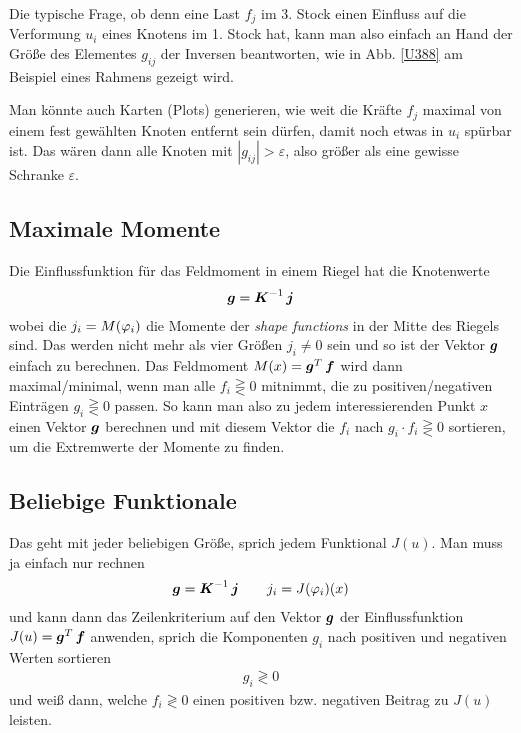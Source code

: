 {Die typische Frage, ob denn eine Last  $f_j$ im 3. Stock einen Einfluss auf die Verformung $u_i$ eines Knotens im 1. Stock hat, kann man also einfach an Hand der Gr\"{o}{\ss}e des Elementes $g_{ij}$ der Inversen beantworten, wie in Abb. \ref{U388} am Beispiel eines Rahmens gezeigt wird.

Man k\"{o}nnte auch Karten (Plots) generieren, wie weit die Kr\"{a}fte $f_j$ maximal von einem fest gew\"{a}hlten Knoten  entfernt sein d\"{u}rfen, damit noch etwas in $u_i$ sp\"{u}rbar ist. Das w\"{a}ren dann alle Knoten mit $|g_{ij}| > \varepsilon$, also gr\"{o}{\ss}er als eine gewisse Schranke $\varepsilon$.


{\textcolor{sectionTitleBlue}{\subsection{Maximale Momente}}}
Die Einflussfunktion f\"{u}r das Feldmoment in einem Riegel hat die Knotenwerte
 \begin{align}
 \mbox{\boldmath $g$} = \mbox{\boldmath $K$}^{-1}\,\mbox{\boldmath $j$}
 \end{align}
wobei die $j_i = M(\varphi_i)$ die Momente der {\em shape functions\/} in der Mitte des Riegels sind. Das werden nicht mehr als vier Gr\"{o}{\ss}en $j_i \neq 0$ sein und so ist der Vektor $\mbox{\boldmath $g$}$ einfach zu berechnen. Das Feldmoment $M(x) = \mbox{\boldmath $g$}^T\,\mbox{\boldmath $f$}$ wird dann maximal/minimal, wenn man alle $f_i \gtreqless 0$ mitnimmt, die zu positiven/negativen Eintr\"{a}gen $g_i \gtreqless 0$ passen. So kann man also zu jedem interessierenden Punkt $x$ einen Vektor $\mbox{\boldmath $g$}$ berechnen und mit diesem Vektor die $f_i$ nach $g_i \cdot f_i \gtreqless 0$ sortieren, um die Extremwerte der Momente zu finden.

{\textcolor{sectionTitleBlue}{\subsection{Beliebige Funktionale}}}
Das geht mit jeder beliebigen Gr\"{o}{\ss}e, sprich jedem Funktional $J(u)$. Man muss ja einfach nur rechnen
\begin{align}
\mbox{\boldmath $g$} = \mbox{\boldmath $K$}^{-1}\,\mbox{\boldmath $j$} \qquad j_i = J(\varphi_i)(x)
\end{align}
und kann dann das \glq Zeilenkriterium\grq{} auf den Vektor $\mbox{\boldmath $g$}$ der Einflussfunktion $J(u) = \mbox{\boldmath $g$}^T\,\mbox{\boldmath $f$}$ anwenden, sprich die Komponenten $g_i$ nach positiven und negativen Werten sortieren
\begin{align}
g_i \gtrless 0
\end{align}
und wei{\ss} dann, welche $f_i\gtrless 0$ einen positiven bzw. negativen Beitrag zu $J(u)$ leisten.

}
